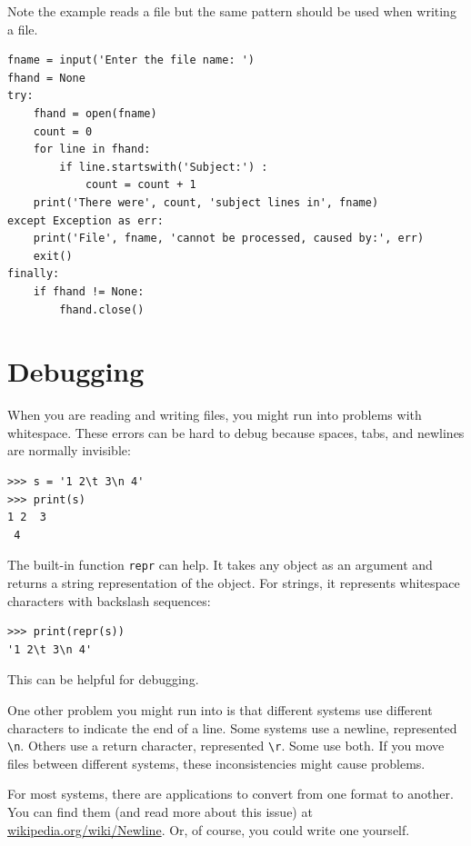 Note the example reads a file but the same pattern should be used when writing a file.

\beforeverb
\begin{verbatim}
fname = input('Enter the file name: ')
fhand = None
try:
    fhand = open(fname)
    count = 0
    for line in fhand:
        if line.startswith('Subject:') :
            count = count + 1
    print('There were', count, 'subject lines in', fname)
except Exception as err:
    print('File', fname, 'cannot be processed, caused by:', err)
    exit()
finally:
    if fhand != None:
        fhand.close()
\end{verbatim}
\afterverb
%



\section{Debugging}


When you are reading and writing files, you might run into problems
with whitespace.  These errors can be hard to debug because spaces,
tabs, and newlines are normally invisible:

\beforeverb
\begin{verbatim}
>>> s = '1 2\t 3\n 4'
>>> print(s)
1 2	 3
 4
\end{verbatim}
\afterverb


The built-in function {\tt repr} can help.  It takes any object as an
argument and returns a string representation of the object.  For
strings, it represents whitespace
characters with backslash sequences:

\beforeverb
\begin{verbatim}
>>> print(repr(s))
'1 2\t 3\n 4'
\end{verbatim}
\afterverb

This can be helpful for debugging.

One other problem you might run into is that different systems
use different characters to indicate the end of a line.  Some
systems use a newline, represented \verb"\n".  Others use
a return character, represented \verb"\r".  Some use both.
If you move files between different systems, these inconsistencies
might cause problems.


For most systems, there are applications to convert from one
format to another.  You can find them (and read more about this
issue) at \url{wikipedia.org/wiki/Newline}.  Or, of course, you
could write one yourself.

